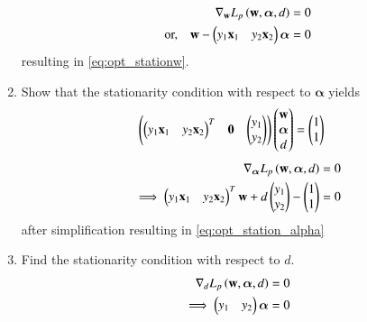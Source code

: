 \documentclass[journal,12pt,twocolumn]{IEEEtran}
\renewcommand\thesection{\arabic{section}}
\begin{document}
\begin{enumerate}[label=\thesection.\arabic*,ref=\thesection.\theenumi]
\begin{align}
\nabla_{\mathbf{w}} L_p\left(\mathbf{w},\bm{\alpha},d\right) &= 0 
\\
\text{or,}\quad \mathbf{w}- 
\begin{pmatrix}y_1\mathbf{x}_1 & y_2\mathbf{x}_2\end{pmatrix}\bm{\alpha} &= 0
\end{align}
resulting in \eqref{eq:opt_stationw}.
\item Show that the stationarity condition with respect to $\bm{\alpha}$ yields
\begin{align}
\begin{pmatrix}\begin{pmatrix}y_1\mathbf{x}_1&y_2\mathbf{x}_2\end{pmatrix}^T & \mathbf{0} & \begin{pmatrix}y_1 \\ y_2\end{pmatrix}\end{pmatrix}\begin{pmatrix}\mathbf{w}\\\bm{\alpha} \\ d\end{pmatrix} 
&= 
\begin{pmatrix}1\\1\end{pmatrix} 
\label{eq:opt_station_alpha}
\end{align}
\solution 
\begin{align}
\nabla_{\bm{\alpha}} L_{p}\left(\mathbf{w},\bm{\alpha},d\right) &= 0 
\\
\implies  
\begin{pmatrix}y_1\mathbf{x}_1& y_2\mathbf{x}_2\end{pmatrix}^T\mathbf{w}+d\begin{pmatrix}y_1 \\ y_2\end{pmatrix}-\begin{pmatrix}1\\1\end{pmatrix}  &= 0
\end{align}
after simplification resulting in \eqref{eq:opt_station_alpha}
%
\item Find the stationarity condition with respect to $d$.
\\
\solution
\begin{align}
\nabla_{d} L_{p}\brak{\vec{w},\bm{\alpha},d} &= 0 
\\
\implies  
\myvec{y_1&y_2} \bm{\alpha}&=0
\\

\end{align}
\end{enumerate}
\end{document}
